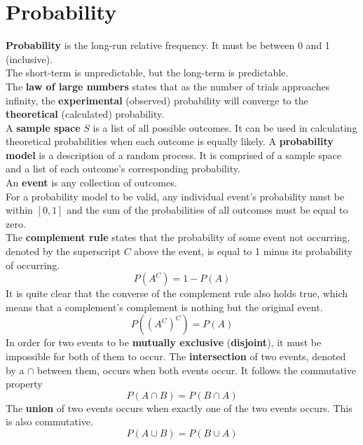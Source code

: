 \documentclass[../AP_Statistics.tex]{subfiles}
\begin{document}
	\chapter{Probability}
		\textbf{Probability} is the long-run relative frequency. It must be between 0 and 1 (inclusive). \\
		The short-term is unpredictable, but the long-term is predictable. \\
		The \textbf{law of large numbers} states that as the number of trials approaches infinity, the \textbf{experimental} (observed) probability will converge to the \textbf{theoretical} (calculated) probability. \\
		A \textbf{sample space} $S$ is a list of all possible outcomes. It can be used in calculating theoretical probabilities when each outcome is equally likely.
		A \textbf{probability model} is a description of a random process. It is comprised of a sample space and a list of each outcome's corresponding probability. \\
		An \textbf{event} is any collection of outcomes. \\
		For a probability model to be valid, any individual event's probability must be within $[0, 1]$ and the sum of the probabilities of all outcomes must be equal to zero. \\
		The \textbf{complement rule} states that the probability of some event not occurring, denoted by the superscript $C$ above the event, is equal to 1 minus its probability of occurring. \\
		$$P\left(A^C\right) = 1 - P(A)$$
		It is quite clear that the converse of the complement rule also holds true, which means that a complement's complement is nothing but the original event. 
		$$P\left(\left(A^C\right)^C\right) = P(A)$$
		In order for two events to be \textbf{mutually exclusive} (\textbf{disjoint}), it must be impossible for both of them to occur.
		The \textbf{intersection} of two events, denoted by a $\cap$ between them, occurs when both events occur. It follows the commutative property
		$$P(A\cap B) = P(B\cap A)$$
		The \textbf{union} of two events occurs when exactly one of the two events occurs. This is also commutative. \\
		$$P(A\cup B) = P(B\cup A)$$
\end{document}
